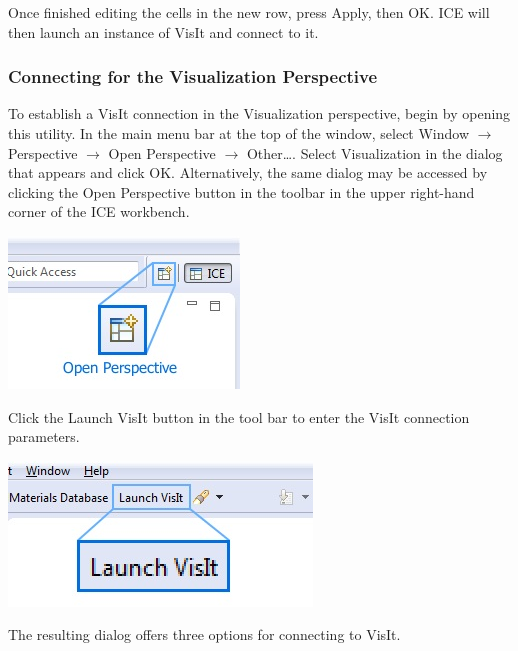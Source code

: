 \documentclass{article}
\begin{document}
Once finished editing the cells in the new row, press Apply, then OK. ICE will
then launch an instance of VisIt and connect to it.

\subsubsection{Connecting for the Visualization Perspective} 

To establish a VisIt connection in the Visualization perspective, begin by
opening this utility. In the main menu bar at the top of the window, select
Window $\rightarrow$ Perspective $\rightarrow$ Open Perspective $\rightarrow$
Other\ldots. Select Visualization in the dialog that appears and click OK.
Alternatively, the same dialog may be accessed by clicking the Open Perspective
button in the toolbar in the upper right-hand corner of the ICE workbench.

\begin{center}
\includegraphics{images/ICE_OpenPerspective}
\end{center}

Click the Launch VisIt button in the tool bar to enter the VisIt connection
parameters.

\begin{center}
\includegraphics{images/ICE_VisItLaunchButton}
\end{center}

The resulting dialog offers three options for connecting to VisIt.
\end{document}
